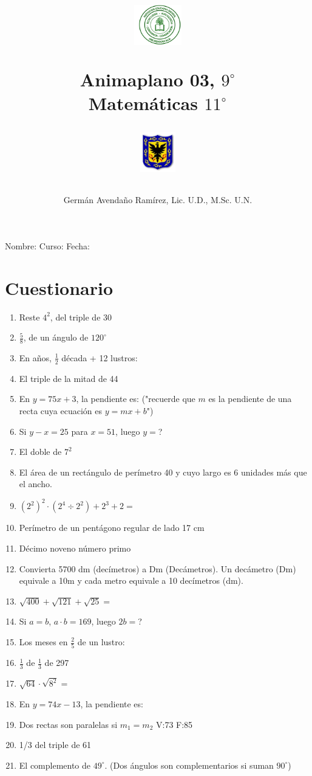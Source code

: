 \documentclass[11pt,twoside,letter]{article}
\author{Germ\'an Avenda\~no Ram\'irez, Lic. U.D., M.Sc. U.N.}
\title{\begin{minipage}{.2\textwidth}
\includegraphics[height=1.75cm]{Images/logo-colegio.png}\end{minipage}
\begin{minipage}{.55\textwidth}
\begin{center}
Animaplano 03, $9^{\circ}$  \\
Matemáticas $11^{\circ}$
\end{center}
\end{minipage}\hfill
\begin{minipage}{.2\textwidth}
\includegraphics[height=1.75cm]{Images/logo-sed.png} 
\end{minipage}}
\date{}
\begin{document}
\maketitle
Nombre: \hrulefill Curso: \underline{\hspace*{44pt}} Fecha: \underline{\hspace*{2.5cm}}
\section*{Cuestionario}
\begin{enumerate}
 \item Reste $4^{2}$, del triple de 30
 \item $\frac{5}{8}$, de un ángulo de $120^{\circ}$
 \item En años, $\frac{1}{2}$ década + 12 lustros:
 \item El triple de la mitad de 44
 \item En $y=75x+3$, la pendiente es: ("recuerde que $m$ es la pendiente de una recta cuya ecuaci\'{o}n es $y=mx+b$")
 \item Si $y-x=25$ para $x=51$, luego $y=$?
 \item El doble de $7^{2}$
 \item El área de un rectángulo de perímetro 40 y cuyo largo es 6 unidades más que el ancho.
 \item $(2^{2})^{2}\cdot (2^{4}\div 2^{2})+2^{3}+2=$
 \item Perímetro de un pentágono regular de lado 17 cm
 \item Décimo noveno número primo
 \item Convierta 5700 dm (decímetros) a Dm (Decámetros). Un decámetro (Dm) equivale a 10m y cada metro equivale a 10 decímetros (dm).
 \item $\sqrt{400}+\sqrt{121}+\sqrt{25}=$
 \item Si $a=b$, $a\cdot b=169$, luego $2b=$?
 \item Los meses en $\frac{2}{5}$ de un lustro:
 \item $\frac{1}{3}$ de $\frac{1}{3}$ de 297
 \item $\sqrt{64}\cdot \sqrt{8^{2}}=$
 \item En $y=74x-13$, la pendiente es:
 \item Dos rectas son paralelas si $m_{1}=m_{2}$ V:73 \quad F:85
 \item 1/3 del triple de 61
 \item El complemento de $49^{\circ}$. (Dos ángulos son complementarios si suman $90^{\circ}$)

\end{enumerate}
\end{document}
